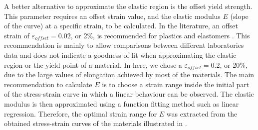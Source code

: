 A better alternative to approximate the elastic region is the offset yield strength. This parameter requires an offset strain value, and the elastic modulus $E$ (slope of the curve) at a specific strain, to be calculated. In the literature, an offset strain of $\varepsilon_{offset}=0.02$, or 2\%, is recommended for plastics and elastomers \cite{instron2019}. This recommendation is mainly to allow comparisons between different laboratories data and does not indicate a goodness of fit when approximating the elastic region or the yield point of a material. In here, we chose a $\varepsilon_{offset}=0.2$, or 20\%, due to the large values of elongation achieved by most of the materials. The main recommendation to calculate $E$ is to choose a strain range inside the initial part of the stress-strain curve in which a linear behaviour can be observed. The elastic modulus is then approximated using a function fitting method such as linear regression. Therefore, the optimal strain range for $E$ was extracted from the obtained stress-strain curves of the materials illustrated in .


